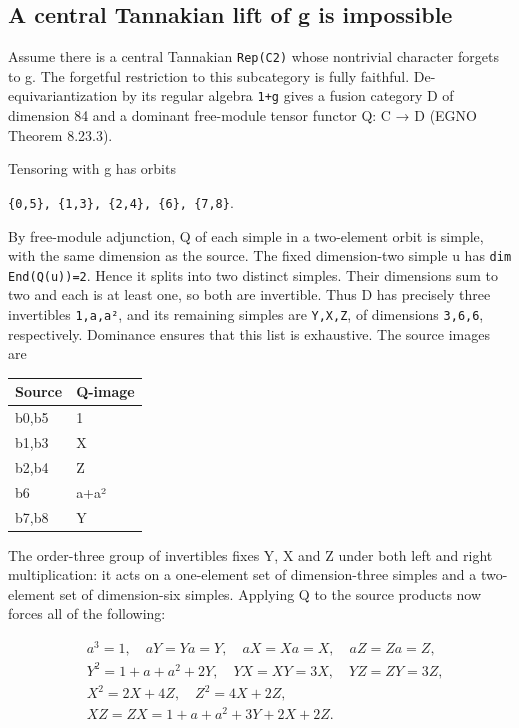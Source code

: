 \hypertarget{a-central-tannakian-lift-of-g-is-impossible}{%
\subsection{A central Tannakian lift of g is
impossible}\label{a-central-tannakian-lift-of-g-is-impossible}}

Assume there is a central Tannakian \texttt{Rep(C2\allowbreak{})} whose
nontrivial character forgets to g. The forgetful restriction to this
subcategory is fully faithful. De-equivariantization by its regular
algebra \texttt{1+g} gives a fusion category D of dimension 84 and a
dominant free-module tensor functor Q: C → D (EGNO Theorem 8.23.3).

Tensoring with g has orbits

\texttt{\{0,5\},\allowbreak{} \{1,3\}\allowbreak{}, \{2,4\allowbreak{}\}, \{6\}\allowbreak{}, \{7,8\allowbreak{}\}}.

By free-module adjunction, Q of each simple in a two-element orbit is
simple, with the same dimension as the source. The fixed dimension-two
simple u has \texttt{dim En\allowbreak{}d(Q(u)\allowbreak{})=2}. Hence
it splits into two distinct simples. Their dimensions sum to two and
each is at least one, so both are invertible. Thus D has precisely three
invertibles \texttt{1,a,a²\allowbreak{}}, and its remaining simples are
\texttt{Y,X,Z}, of dimensions \texttt{3,6,6}, respectively. Dominance
ensures that this list is exhaustive. The source images are

\begin{longtable}[]{@{}ll@{}}
\toprule\noalign{}
Source & Q-image \\
\midrule\noalign{}
\endhead
\bottomrule\noalign{}
\endlastfoot
b0,b5 & 1 \\
b1,b3 & X \\
b2,b4 & Z \\
b6 & a+a² \\
b7,b8 & Y \\
\end{longtable}

The order-three group of invertibles fixes Y, X and Z under both left
and right multiplication: it acts on a one-element set of
dimension-three simples and a two-element set of dimension-six simples.
Applying Q to the source products now forces all of the following:

\[
\begin{aligned}
&a^3=1,\quad aY=Ya=Y,\quad aX=Xa=X,\quad aZ=Za=Z,\\
&Y^2=1+a+a^2+2Y,\quad YX=XY=3X,\quad YZ=ZY=3Z,\\
&X^2=2X+4Z,\quad Z^2=4X+2Z,\\
&XZ=ZX=1+a+a^2+3Y+2X+2Z.
\end{aligned} \tag{3}
\]

